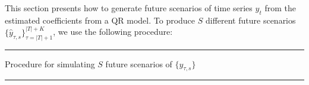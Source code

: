 This section presents how to generate future scenarios of time series $y_t$ from the estimated coefficients from a QR model. 
To produce $S$ different future scenarios $\{ \hat{y}_{\tau,s} \}_{\tau=|T|+1}^{|T|+K}$, we use the following procedure:

\noindent\rule{\columnwidth}{3pt}

Procedure for simulating $S$ future scenarios of $\{y_{\tau,s}\}$

\noindent\rule{\columnwidth}{1pt}


